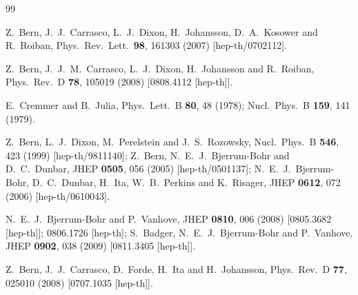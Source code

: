 \documentclass[aps,prl,twocolumn,groupedaddress,draft,showpacs,nofootinbib]{revtex4}
\begin{document}
\begin{thebibliography}{99}

Z.~Bern, J.~J.~Carrasco, L.~J.~Dixon, H.~Johansson, D.~A.~Kosower 
and R.~Roiban,
Phys.\ Rev.\ Lett.\  {\bf 98}, 161303 (2007)
[hep-th/0702112].

Z.~Bern, J.~J.~M.~Carrasco, L.~J.~Dixon, H.~Johansson and R.~Roiban,
Phys.\ Rev.\  D {\bf 78}, 105019 (2008)
[0808.4112 [hep-th]].

E.~Cremmer and B.~Julia,
Phys.\ Lett.\ B {\bf 80}, 48 (1978);
Nucl.\ Phys.\  B {\bf 159}, 141 (1979).

Z.~Bern, L.~J.~Dixon, M.~Perelstein and J.~S.~Rozowsky,
Nucl.\ Phys.\ B {\bf 546}, 423 (1999)
[hep-th/9811140];
%
Z.~Bern, N.~E.~J.~Bjerrum-Bohr and D.~C.~Dunbar,
JHEP {\bf 0505}, 056 (2005)
[hep-th/0501137];
%
N.~E.~J.~Bjerrum-Bohr, D.~C.~Dunbar, H.~Ita, W.~B.~Perkins and K.~Risager,
JHEP {\bf 0612}, 072 (2006)
[hep-th/0610043].

N.~E.~J.~Bjerrum-Bohr and P.~Vanhove,
JHEP {\bf 0810}, 006 (2008)
[0805.3682 [hep-th]];
%
0806.1726 [hep-th];
%
S.~Badger, N.~E.~J.~Bjerrum-Bohr and P.~Vanhove,
JHEP {\bf 0902}, 038 (2009)
[0811.3405 [hep-th]].

Z.~Bern, J.~J.~Carrasco, D.~Forde, H.~Ita and H.~Johansson,
Phys.\ Rev.\  D {\bf 77}, 025010 (2008)
[0707.1035 [hep-th]].


\end{thebibliography}
\end{document}
